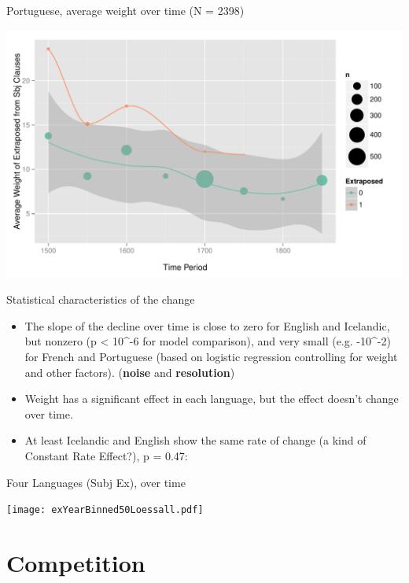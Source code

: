 \documentclass[hyperref={pdfpagelabels=false}]{beamer}
\begin{document}
\begin{frame}{Portuguese, average weight over time (N = 2398)}

\begin{center}
\includegraphics[width=1.1\textwidth]{exWeightYearBinned50Loessport.pdf}
\end{center}
\end{frame}

\begin{frame}{Statistical characteristics of the change}
    \begin{itemize}
    	\item The slope of the decline over time is close to zero for English and Icelandic, but nonzero (p < 10^{-6} for model comparison), and very small (e.g. -10^{-2}) for French and Portuguese (based on logistic regression controlling for weight and other factors). (\textbf{noise} and \textbf{resolution})
	\item Weight has a significant effect in each language, but the effect doesn't change over time.
	\item At least Icelandic and English show the same rate of change (a kind of Constant Rate Effect?), p = 0.47:
\end{itemize}
\end{frame}



\begin{frame}{Four Languages (Subj Ex), over time}

\begin{center}
\texttt{[image: exYearBinned50Loessall.pdf]}
\end{center}
\end{frame}

\section{Competition}
\end{document}
